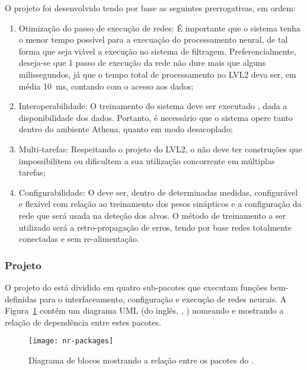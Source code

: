 O projeto foi desenvolvido tendo por base as seguintes prerrogativas, em
ordem:

\begin{enumerate}
\item Otimização do passo de execução de redes: É importante que o sistema
tenha o menor tempo possível para a execuação do processamento neural, de tal
forma que seja viável a execução no sistema de filtragem. Preferencialmente,
deseja-se que 1 passo de execução da rede não dure mais que alguns
milissegundos, já que o tempo total de processamento no LVL2 deva ser, em
média 10~ms, contando com o acesso aos dados;
\item Interoperabilidade: O treinamento do sistema deve ser executado
, dada a disponibilidade dos dados. Portanto, é necessário que o
sistema opere tanto dentro do ambiente Athena, quanto em modo desacoplado;
\item Multi-tarefas: Respeitando o projeto do LVL2, o  não
deve ter construções que impossibilitem ou dificultem a sua utilização
concorrente em múltiplas tarefas;
\item Configurabilidade: O  deve ser, dentro de determinadas
medidas, configurável e flexível com relação ao treinamento dos pesos
sinápticos e a configuração da rede que será usada na deteção dos alvos. O
método de treinamento a ser utilizado será a retro-propagação de erros, tendo
por base redes totalmente conectadas e sem re-alimentação.
\end{enumerate}

\subsubsection{Projeto}

O projeto do  está dividido em quatro sub-pacotes que
executam funções bem-definidas para o interfaceamento, configuração e execução
de redes neurais. A Figura~\ref{fig:nr-packages} contém um diagrama UML (do
inglês, , \cite{booch}) nomeando e
mostrando a relação de dependência entre estes pacotes.

\begin{figure}
\begin{center}
\texttt{[image: nr-packages]}
\end{center}
\caption{Diagrama de blocos mostrando a relação entre os pacotes do
.}
\label{fig:nr-packages}
\end{figure}

